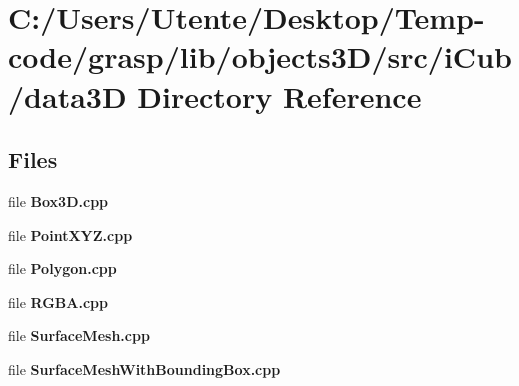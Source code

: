 \section{C\+:/\+Users/\+Utente/\+Desktop/\+Temp-\/code/grasp/lib/objects3\+D/src/i\+Cub/data3\+D Directory Reference}
\label{dir_17976015326c068e5ef521d196489202}
\subsection*{Files}
\begin{DoxyCompactItemize}
\item 
file {\bfseries Box3\+D.\+cpp}
\item 
file {\bfseries Point\+X\+Y\+Z.\+cpp}
\item 
file {\bfseries Polygon.\+cpp}
\item 
file {\bfseries R\+G\+B\+A.\+cpp}
\item 
file {\bfseries Surface\+Mesh.\+cpp}
\item 
file {\bfseries Surface\+Mesh\+With\+Bounding\+Box.\+cpp}
\end{DoxyCompactItemize}

